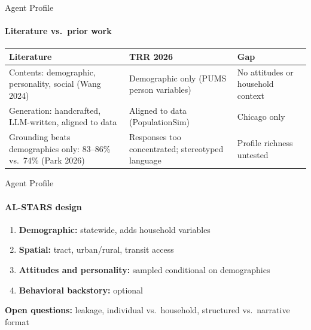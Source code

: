 \documentclass{beamer}
\begin{document}
\begin{frame}{Agent Profile}
\framesubtitle{Literature vs.\ prior work}
\small
\renewcommand{\arraystretch}{1.3}
\begin{tabular}{L{0.35}L{0.30}L{0.25}}
\toprule
Literature & TRR 2026 & Gap \\
\midrule
Contents: demographic, personality, social (Wang 2024) & Demographic only (PUMS person variables) & No attitudes or household context \\
Generation: handcrafted, LLM-written, aligned to data & Aligned to data (PopulationSim) & Chicago only \\
Grounding beats demographics only: 83--86\% vs.\ 74\% (Park 2026) & Responses too concentrated; stereotyped language & Profile richness untested \\
\bottomrule
\end{tabular}
\end{frame}


\begin{frame}{Agent Profile}
\framesubtitle{AL-STARS design}
\begin{enumerate}
\item \textbf{Demographic:} statewide, adds household variables
\item \textbf{Spatial:} tract, urban/rural, transit access
\item \textbf{Attitudes and personality:} sampled conditional on demographics
\item \textbf{Behavioral backstory:} optional
\end{enumerate}
\vspace{1ex}
\textbf{Open questions:} leakage, individual vs.\ household, structured vs.\ narrative format
\end{frame}
\end{document}
